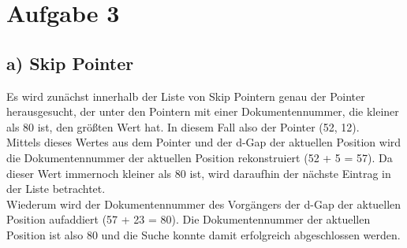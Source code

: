 \section*{Aufgabe 3}

\subsection*{a) Skip Pointer}

Es wird zunächst innerhalb der Liste von Skip Pointern genau der Pointer herausgesucht, der unter den Pointern mit einer Dokumentennummer, die kleiner als 80 ist, den größten Wert hat. In diesem Fall also der Pointer (52, 12). \\
Mittels dieses Wertes aus dem Pointer und der d-Gap der aktuellen Position wird die Dokumentennummer der aktuellen Position rekonstruiert (52 + 5 = 57). Da dieser Wert immernoch kleiner als 80 ist, wird daraufhin der nächste Eintrag in der Liste betrachtet.
\\Wiederum wird der Dokumentennummer des Vorgängers der d-Gap der aktuellen Position aufaddiert (57 + 23 = 80). Die Dokumentennummer der aktuellen Position ist also 80 und die Suche konnte damit erfolgreich abgeschlossen werden.

